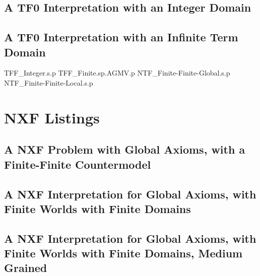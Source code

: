 \documentclass{easychair}
\begin{document}
\newpage
\subsection{A TF0 Interpretation with an Integer Domain}
\begin{small}

\end{small}

\newpage
\subsection{A TF0 Interpretation with an Infinite Term Domain}
\begin{small}

\end{small}

TFF_Integer.s.p
TFF_Finite.sp.AGMV.p
NTF_Finite-Finite-Global.s.p
NTF_Finite-Finite-Local.s.p

\newpage
\section{NXF Listings}
\label{NXFListings}

\subsection{A NXF Problem with Global Axioms, with a Finite-Finite Countermodel}
\begin{small}

\end{small}

\newpage
\subsection{A NXF Interpretation for Global Axioms, with Finite Worlds with Finite Domains}
\begin{small}

\end{small}

\newpage
\subsection{A NXF Interpretation for Global Axioms, with Finite Worlds with Finite Domains, Medium Grained}
\begin{small}

\end{small}
\end{document}
